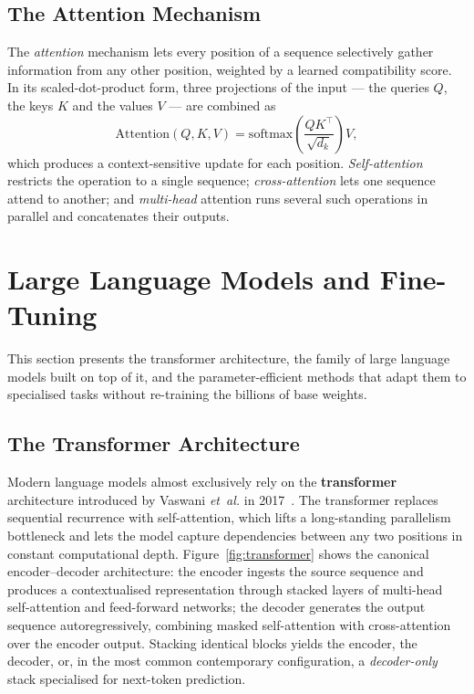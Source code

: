 \subsection{The Attention Mechanism}
The \emph{attention} mechanism lets every position of a sequence
selectively gather information from any other position, weighted by a
learned compatibility score. In its scaled-dot-product form, three
projections of the input --- the queries $Q$, the keys $K$ and the
values $V$ --- are combined as
\begin{equation}
    \mathrm{Attention}(Q, K, V) =
        \mathrm{softmax}\!\left(\frac{QK^{\top}}{\sqrt{d_k}}\right) V,
    \label{eq:attention}
\end{equation}
\noindent which produces a context-sensitive update for each position.
\emph{Self-attention} restricts the operation to a single sequence;
\emph{cross-attention} lets one sequence attend to another; and
\emph{multi-head} attention runs several such operations in parallel
and concatenates their outputs.

\section{Large Language Models and Fine-Tuning}

This section presents the transformer architecture, the family of
large language models built on top of it, and the parameter-efficient
methods that adapt them to specialised tasks without re-training the
billions of base weights.

\subsection{The Transformer Architecture}
Modern language models almost exclusively rely on the
\textbf{transformer} architecture introduced by Vaswani \emph{et~al.}
in 2017~\cite{vaswani2017attention}. The transformer replaces sequential
recurrence with self-attention, which lifts a long-standing parallelism
bottleneck and lets the model capture dependencies between any two
positions in constant computational depth. Figure~\ref{fig:transformer}
shows the canonical encoder--decoder architecture: the encoder ingests
the source sequence and produces a contextualised representation
through stacked layers of multi-head self-attention and feed-forward
networks; the decoder generates the output sequence autoregressively,
combining masked self-attention with cross-attention over the encoder
output. Stacking identical blocks yields the encoder, the decoder, or,
in the most common contemporary configuration, a \emph{decoder-only}
stack specialised for next-token prediction.

